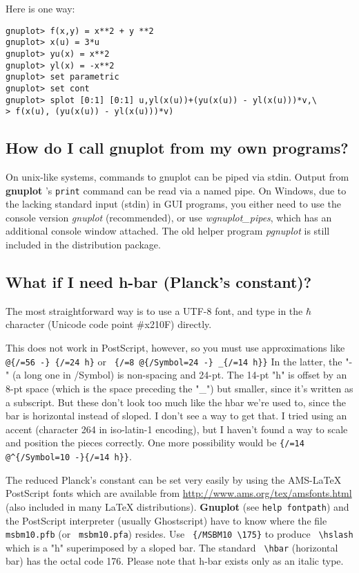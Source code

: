 \documentclass[a4paper,11pt]{article}
\def\http#1{{\small\href{http://#1}{\url{http://#1}}}}
\newcommand{\http}[1]%
            {\htmladdnormallink{\latex{\url{http://#1}}%
                    \html{\textit{http://#1}}}%
                {http://#1}%
            }
\newcommand{\gnuplot}{\textbf{gnuplot }}
\newcommand{\Gnuplot}{\textbf{Gnuplot }}
\begin{document}
Here is one way:
\small
\begin{verbatim}
gnuplot> f(x,y) = x**2 + y **2
gnuplot> x(u) = 3*u
gnuplot> yu(x) = x**2
gnuplot> yl(x) = -x**2
gnuplot> set parametric
gnuplot> set cont
gnuplot> splot [0:1] [0:1] u,yl(x(u))+(yu(x(u)) - yl(x(u)))*v,\
> f(x(u), (yu(x(u)) - yl(x(u)))*v)
\end{verbatim}
\normalsize


\subsection{How do I call \gnuplot from my own programs?}

On unix-like systems, commands to gnuplot can be piped via stdin.
Output from \gnuplot's \verb+print+ command can be read via a named pipe.
On Windows, due to the lacking standard input (stdin) in GUI programs,
you either need to use the console version \textit{gnuplot} (recommended),
or use \textit{wgnuplot\_pipes}, which has an additional console window
attached. The old helper program \textit{pgnuplot} is still included
in the distribution package.


\subsection{What if I need h-bar (Planck's constant)?}

The most straightforward way is to use a UTF-8 font, and type in the
$\hbar$ character (Unicode code point \#x210F) directly. 
 
This does not work in PostScript, however, so you must use approximations
like
\verb+ @{/=56 -} {/=24 h}+ or
\verb+ {/=8 @{/Symbol=24 -} _{/=14 h}}+
In the latter, the "-" (a long one in /Symbol) is non-spacing and 24-pt.
The 14-pt "h" is offset by an 8-pt space (which is the space preceding
the "\_") but smaller, since it's written as a subscript.
But these don't look too much like the hbar we're used to, since the bar
is horizontal instead of sloped.  I don't see a way to get that.  I
tried using an accent (character 264 in iso-latin-1 encoding), but I haven't found a
way to scale and position the pieces correctly. 
One more possibility would be \verb+{/=14 @^{/Symbol=10 -}{/=14 h}}+.

The reduced Planck's constant can be set very easily by using the
AMS-LaTeX PostScript fonts which are available from
\http{www.ams.org/tex/amsfonts.html} (also included in many LaTeX
distributions). \Gnuplot{} (see \verb+help fontpath+) and the
PostScript interpreter (usually Ghostscript) have to know where the
file \verb+ msbm10.pfb+ (or \verb+ msbm10.pfa+) resides. Use
\verb+ {/MSBM10 \175}+ to produce \verb+ \hslash+ which is a "h"
superimposed by a sloped bar. The standard \verb+ \hbar+ (horizontal
bar) has the octal code 176. Please note that h-bar exists only as an
italic type.
\end{document}
